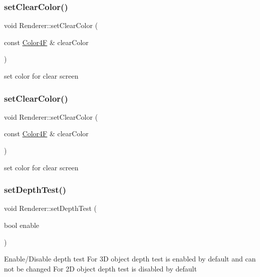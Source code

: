 \subsubsection{\texorpdfstring{set\+Clear\+Color()}{setClearColor()}\hspace{0.1cm}{\footnotesize\ttfamily [1/2]}}
{\footnotesize\ttfamily void Renderer\+::set\+Clear\+Color (\begin{DoxyParamCaption}\item[{const \hyperlink{structColor4F}{Color4F} \&}]{clear\+Color }\end{DoxyParamCaption})}

set color for clear screen \mbox{\label{classRenderer_ac098692bd1bad4e15176c9a95c6e1183}} 
\subsubsection{\texorpdfstring{set\+Clear\+Color()}{setClearColor()}\hspace{0.1cm}{\footnotesize\ttfamily [2/2]}}
{\footnotesize\ttfamily void Renderer\+::set\+Clear\+Color (\begin{DoxyParamCaption}\item[{const \hyperlink{structColor4F}{Color4F} \&}]{clear\+Color }\end{DoxyParamCaption})}

set color for clear screen \mbox{\label{classRenderer_a6d81add581a355d8da31c51702f398d4}} 
\subsubsection{\texorpdfstring{set\+Depth\+Test()}{setDepthTest()}\hspace{0.1cm}{\footnotesize\ttfamily [1/2]}}
{\footnotesize\ttfamily void Renderer\+::set\+Depth\+Test (\begin{DoxyParamCaption}\item[{bool}]{enable }\end{DoxyParamCaption})}

Enable/\+Disable depth test For 3D object depth test is enabled by default and can not be changed For 2D object depth test is disabled by default \mbox{\label{classRenderer_a6d81add581a355d8da31c51702f398d4}} 
